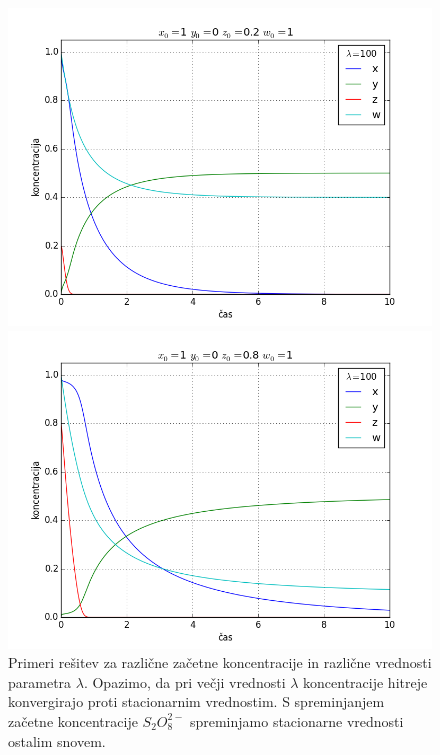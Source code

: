 \documentclass[slovene,11pt,a4paper]{article}
\numberwithin{equation}{section} %
\numberwithin{figure}{section} %
\numberwithin{table}{section} %
\begin{document}
\begin{figure}[h]
{\begin{minipage}[t]{0.5\paperwidth}
\begin{flushleft}

\includegraphics[scale=0.4]{slike/110_2100.png}
\hspace{\fill}
\end{flushleft}
\end{minipage}
\begin{minipage}[t]{0.5\paperwidth}
\includegraphics[scale=0.4]{slike/110_8100.png}
\end{minipage}%
}
\caption{Primeri rešitev za različne začetne koncentracije in različne vrednosti parametra $\lambda$. Opazimo, da pri večji vrednosti $\lambda$ koncentracije hitreje konvergirajo proti stacionarnim vrednostim. S spreminjanjem začetne koncentracije $S_2 O_8^{2-}$ spreminjamo stacionarne vrednosti ostalim snovem.}
\end{figure}
\end{document}
